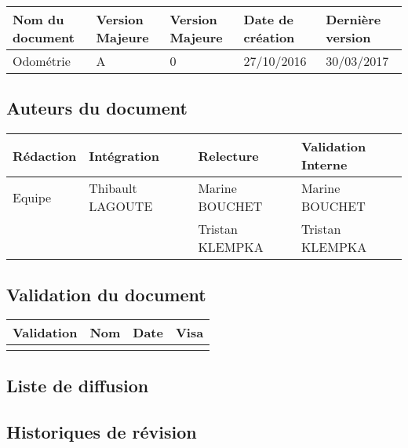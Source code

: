\documentclass[10pt,a4paper]{article}
\begin{document}
\begin{center}
    \begin{tabular}{| l | l | l | l | l |}
    \hline
    \rowcolor{gray} Nom du document & Version Majeure & Version Majeure & Date de création & Dernière version \\ \hline
    Odométrie & A & 0 & 27/10/2016 & 30/03/2017 \\ \hline
    \end{tabular}
\end{center}


\subsection*{Auteurs du document}

\begin{center}
    \begin{tabular}{| l | l | l | l |}
    \hline
    \rowcolor{gray} Rédaction & Intégration & Relecture & Validation Interne \\ \hline
    Equipe & Thibault LAGOUTE & Marine BOUCHET & Marine BOUCHET \\ 
     &   & Tristan KLEMPKA  & Tristan KLEMPKA \\ \hline
    \end{tabular}
\end{center}

\subsection*{Validation du document}

\begin{center}
    \begin{tabular}{| l | l | l | l |}
    \hline
     \rowcolor{gray} Validation & Nom & Date & Visa \\ \hline
    & & & \\
     \hline
    \end{tabular}
\end{center}

\subsection*{Liste de diffusion}


\subsection*{Historiques de révision}
\end{document}
